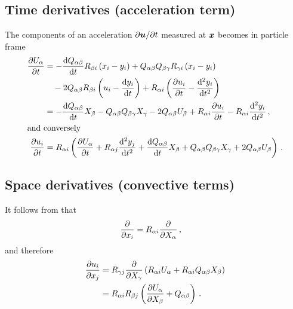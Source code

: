 \documentclass[thesis.tex]{subfiles}
\begin{document}
\subsection{Time derivatives (acceleration term)}
The components of an acceleration $\partial \mbox{\boldmath$u$}/\partial t$ measured at $\mbox{\boldmath$x$}$ becomes in particle frame
\begin{align}
    \pdiff{U_\alpha}{t} &= -\diff{Q_{\alpha \beta}}{t}R_{\beta i}\left(x_i - y_i\right) + Q_{\alpha \beta}Q_{\beta \gamma}R_{\gamma i}\left(x_i - y_i\right) \nn\\
    &\quad- 2Q_{\alpha \beta}R_{\beta i}\left(u_i - \diff{y_i}{t}\right) + R_{\alpha i}\left(\pdiff{u_i}{t} - \frac{\rd^2 y_i}{\rd t^2}\right) \nn \\
    &= -\diff{Q_{\alpha \beta}}{t}X_\beta - Q_{\alpha \beta}Q_{\beta \gamma}X_\gamma - 2Q_{\alpha \beta}U_\beta + R_{\alpha i}\pdiff{u_i}{t} -R_{\alpha i}\frac{\rd^2 y_i}{\rd t^2}\,,\\
    \intertext{and conversely}
    \pdiff{u_i}{t} &= R_{\alpha i}\left(\pdiff{U_\alpha}{t} + R_{\alpha j}\frac{\rd^2y_j}{\rd t^2} + \diff{Q_{\alpha \beta}}{t}X_\beta + Q_{\alpha \beta}Q_{\beta \gamma}X_\gamma + 2Q_{\alpha \beta}U_\beta \right)\,.
    \eqnlab{partialu}
\end{align}
\subsection{Space derivatives (convective terms)}
It follows from  that
\begin{align}
 	\frac{\partial }{\partial x_i} &= R_{\alpha i}\frac{\partial }{\partial X_\alpha}\,, 
 \end{align} 
 and therefore
 \begin{align}
 	\pdiff{u_i}{x_j} &= R_{\gamma j}\pdiff{}{X_\gamma}\left(R_{\alpha i}U_\alpha + R_{\alpha i}Q_{\alpha \beta}X_\beta\right) \nn\\
 	&= R_{\alpha i}R_{\beta j}\left(\pdiff{U_\alpha}{X_\beta}+Q_{\alpha \beta}\right)\,.\eqnlab{dudx}
 \end{align}
\end{document}
